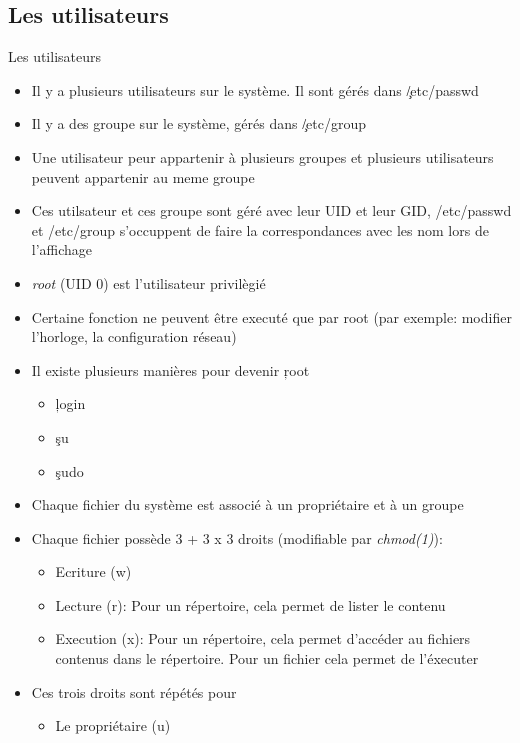 \subsection{Les utilisateurs}

\begin{frame}[fragile=singleslide]{Les utilisateurs}
  \begin{itemize}
  \item Il y a plusieurs utilisateurs sur le système. Il sont gérés
    dans \c{/etc/passwd}
  \item Il y a des groupe sur le système, gérés dans \c{/etc/group}
  \item Une utilisateur peur appartenir à plusieurs groupes et
    plusieurs utilisateurs peuvent appartenir au meme groupe
  \item Ces utilsateur et ces groupe sont géré avec leur UID et
    leur GID, /etc/passwd et /etc/group s'occuppent de faire la
    correspondances avec les nom lors de l'affichage
  \item \emph{root} (UID 0) est l'utilisateur privilègié
  \item Certaine fonction ne peuvent être executé que par root (par
    exemple: modifier l'horloge, la configuration réseau)
  \item Il existe plusieurs manières pour devenir \c{root}
    \begin{itemize}
    \item \c{login}
    \item \c{su}
    \item \c{sudo}
    \end{itemize}
  \item Chaque fichier du système est associé à un propriétaire et à un groupe
  \item Chaque fichier possède 3 + 3 x 3 droits (modifiable par \emph{chmod(1)}):
    \begin{itemize}
    \item Ecriture (w)
    \item Lecture (r): Pour un répertoire, cela permet de lister le contenu
    \item Execution (x): Pour un répertoire, cela permet d'accéder au
      fichiers contenus dans le répertoire. Pour un fichier cela permet de
      l'éxecuter
    \end{itemize}
  \item Ces trois droits sont répétés pour
    \begin{itemize}
    \item Le propriétaire (u)

\end{itemize}
\end{itemize}
\end{frame}

